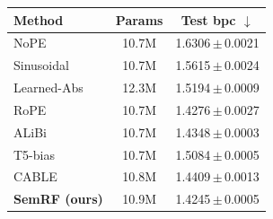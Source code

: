 \begin{tabular}{lcc}
\toprule
Method & Params & Test bpc $\downarrow$ \\
\midrule
NoPE & 10.7M & 1.6306\,$\pm$\,0.0021 \\
Sinusoidal & 10.7M & 1.5615\,$\pm$\,0.0024 \\
Learned-Abs & 12.3M & 1.5194\,$\pm$\,0.0009 \\
RoPE & 10.7M & 1.4276\,$\pm$\,0.0027 \\
ALiBi & 10.7M & 1.4348\,$\pm$\,0.0003 \\
T5-bias & 10.7M & 1.5084\,$\pm$\,0.0005 \\
CABLE & 10.8M & 1.4409\,$\pm$\,0.0013 \\
\textbf{SemRF (ours)} & 10.9M & 1.4245\,$\pm$\,0.0005 \\
\bottomrule
\end{tabular}
